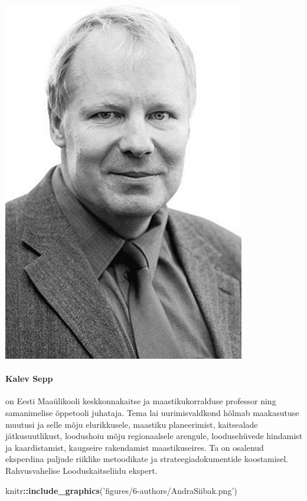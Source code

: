 \documentclass[estonian,]{article}
\newenvironment{Shaded}{\begin{snugshade}}{\end{snugshade}}
\newcommand{\KeywordTok}[1]{\textcolor[rgb]{0.13,0.29,0.53}{\textbf{#1}}}
\newcommand{\NormalTok}[1]{#1}
\newcommand{\OperatorTok}[1]{\textcolor[rgb]{0.81,0.36,0.00}{\textbf{#1}}}
\newcommand{\StringTok}[1]{\textcolor[rgb]{0.31,0.60,0.02}{#1}}
\let\oldparagraph\paragraph
\renewcommand{\paragraph}[1]{\oldparagraph{#1}\mbox{}}
\begin{document}
\begin{flushleft}\includegraphics[width=0.5\linewidth]{figures/6-authors/KalevSepp} \end{flushleft}

\hypertarget{kalev-sepp}{%
\paragraph{Kalev Sepp}\label{kalev-sepp}}

on Eesti Maaülikooli keskkonnakaitse ja maastikukorralduse professor ning samanimelise õppetooli juhataja. Tema lai uurimisvaldkond hõlmab maakasutuse muutusi ja selle mõju elurikkusele, maastiku planeerimist, kaitsealade jätkusuutlikust, loodushoiu mõju regionaalsele arengule, loodusehüvede hindamist ja kaardistamist, kaugseire rakendamist maastikuseires. Ta on osalenud eksperdina paljude riiklike metoodikate ja strateegiadokumentide koostamisel. Rahvusvahelise Looduskaitseliidu ekspert.

\begin{Shaded}
\begin{Highlighting}[]
\NormalTok{knitr}\OperatorTok{::}\KeywordTok{include_graphics}\NormalTok{(}\StringTok{'figures/6-authors/AndraSiibak.png'}\NormalTok{)}
\end{Highlighting}
\end{Shaded}
\end{document}
